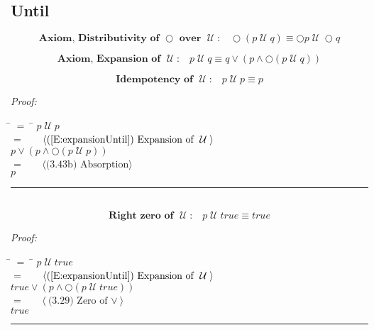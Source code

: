 \documentclass[fleqn, leqno]{article}
\newcommand{\lgap}{2pt}                             %
\newcommand{\mymathindent}{24pt}                      %
\newcommand{\Until}{\;\mathcal{U}\;}
\newcommand{\Next}{\bigcirc}
\newcommand{\myqed}{\hfill\rule[-.23ex]{1.2ex}{2.0ex}}
\newcommand{\Gll} {\langle}                         %
\newcommand{\Ggg} {\rangle}                         %
\newcommand{\Hint}[1]     {\ \ \ $\Gll              \mbox{#1} \Ggg$ }   %
\begin{document}
\subsection{Until}

\begin{equation}\label{E:distNextUntil}
\textbf{Axiom, Distributivity of $\Next$ over $\Until$:}\quad \Next (p \Until q) \equiv \Next p \Until \Next q
\end{equation}

\begin{equation}\label{E:expansionUntil}
\textbf{Axiom, Expansion of $\Until$:}\quad p \Until q \equiv q \lor (p \land \Next (p \Until q))
\end{equation}


\begin{equation}\label{E:idemUntil}
\textbf{Idempotency of $\Until$:}\quad p \Until p \equiv p
\end{equation}

\emph{Proof:}
\begin{tabbing}
\hspace{\mymathindent} \= $= \;$ \= \kill
  \> \>   $p \Until p$\\[\lgap]
  \> $=$  \>  \Hint{(\ref{E:expansionUntil}) Expansion of $\Until$}\\[\lgap]
  \> \>   $p \lor (p \land \Next(p \Until p))$\\[\lgap]
  \> $=$  \>  \Hint{(3.43b) Absorption}\\[\lgap]
  \> \>   $p$\\[\lgap]
\end{tabbing}
\myqed\\[\lgap]

\begin{equation}\label{E:zeroUntil}
\textbf{Right zero of $\Until$:}\quad p \Until true \equiv true
\end{equation}

\emph{Proof:}
\begin{tabbing}
\hspace{\mymathindent} \= $= \;$ \= \kill
  \> \>   $p \Until true$\\[\lgap]
  \> $=$  \>  \Hint{(\ref{E:expansionUntil}) Expansion of $\Until$}\\[\lgap]
  \> \>   $true \lor (p \land \Next(p \Until true))$\\[\lgap]
  \> $=$  \>  \Hint{(3.29) Zero of $\lor$}\\[\lgap]
  \> \>   $true$\\[\lgap]
\end{tabbing}
\myqed\\[\lgap]
\end{document}
